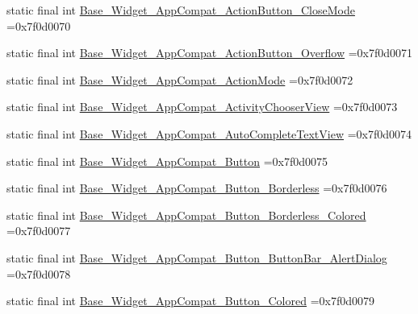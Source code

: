 \begin{DoxyCompactItemize}
static final int \mbox{\hyperlink{classcom_1_1example_1_1trainawearapplication_1_1_r_1_1style_a372a0ffafcc3e87aa2699bbf36bd1cf3}{Base\+\_\+\+Widget\+\_\+\+App\+Compat\+\_\+\+Action\+Button\+\_\+\+Close\+Mode}} =0x7f0d0070
\item 
static final int \mbox{\hyperlink{classcom_1_1example_1_1trainawearapplication_1_1_r_1_1style_a46a44f5cc26d55f5e4d5f5c8866272cb}{Base\+\_\+\+Widget\+\_\+\+App\+Compat\+\_\+\+Action\+Button\+\_\+\+Overflow}} =0x7f0d0071
\item 
static final int \mbox{\hyperlink{classcom_1_1example_1_1trainawearapplication_1_1_r_1_1style_a42ecb5fabf316facea69e44ee675818c}{Base\+\_\+\+Widget\+\_\+\+App\+Compat\+\_\+\+Action\+Mode}} =0x7f0d0072
\item 
static final int \mbox{\hyperlink{classcom_1_1example_1_1trainawearapplication_1_1_r_1_1style_abad60b8e96bffecab37ab5b31479f875}{Base\+\_\+\+Widget\+\_\+\+App\+Compat\+\_\+\+Activity\+Chooser\+View}} =0x7f0d0073
\item 
static final int \mbox{\hyperlink{classcom_1_1example_1_1trainawearapplication_1_1_r_1_1style_a1f962ce67c86c0dc443aa4e159e6b983}{Base\+\_\+\+Widget\+\_\+\+App\+Compat\+\_\+\+Auto\+Complete\+Text\+View}} =0x7f0d0074
\item 
static final int \mbox{\hyperlink{classcom_1_1example_1_1trainawearapplication_1_1_r_1_1style_af89772a44960e2326647632406cbaff8}{Base\+\_\+\+Widget\+\_\+\+App\+Compat\+\_\+\+Button}} =0x7f0d0075
\item 
static final int \mbox{\hyperlink{classcom_1_1example_1_1trainawearapplication_1_1_r_1_1style_ada98996e828fc930c5f81f6ab4d43e76}{Base\+\_\+\+Widget\+\_\+\+App\+Compat\+\_\+\+Button\+\_\+\+Borderless}} =0x7f0d0076
\item 
static final int \mbox{\hyperlink{classcom_1_1example_1_1trainawearapplication_1_1_r_1_1style_a0113fe1adcbac70a85bb7bbb85997e36}{Base\+\_\+\+Widget\+\_\+\+App\+Compat\+\_\+\+Button\+\_\+\+Borderless\+\_\+\+Colored}} =0x7f0d0077
\item 
static final int \mbox{\hyperlink{classcom_1_1example_1_1trainawearapplication_1_1_r_1_1style_a55aecdf9d2e2a4a32419286a6d116242}{Base\+\_\+\+Widget\+\_\+\+App\+Compat\+\_\+\+Button\+\_\+\+Button\+Bar\+\_\+\+Alert\+Dialog}} =0x7f0d0078
\item 
static final int \mbox{\hyperlink{classcom_1_1example_1_1trainawearapplication_1_1_r_1_1style_af7df348931712b34ecd9b0d27a527508}{Base\+\_\+\+Widget\+\_\+\+App\+Compat\+\_\+\+Button\+\_\+\+Colored}} =0x7f0d0079
\item 

\end{DoxyCompactItemize}
